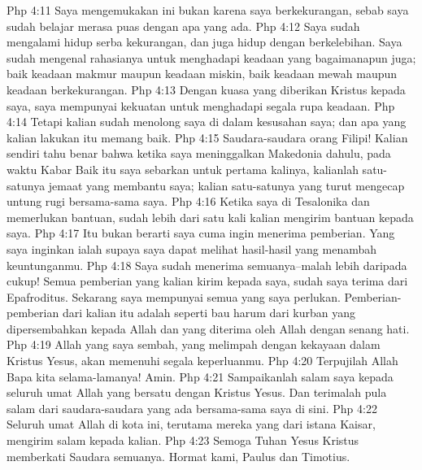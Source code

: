 Php 4:11  Saya mengemukakan ini bukan karena saya berkekurangan, sebab saya sudah belajar merasa puas dengan apa yang ada.
Php 4:12  Saya sudah mengalami hidup serba kekurangan, dan juga hidup dengan berkelebihan. Saya sudah mengenal rahasianya untuk menghadapi keadaan yang bagaimanapun juga; baik keadaan makmur maupun keadaan miskin, baik keadaan mewah maupun keadaan berkekurangan.
Php 4:13  Dengan kuasa yang diberikan Kristus kepada saya, saya mempunyai kekuatan untuk menghadapi segala rupa keadaan.
Php 4:14  Tetapi kalian sudah menolong saya di dalam kesusahan saya; dan apa yang kalian lakukan itu memang baik.
Php 4:15  Saudara-saudara orang Filipi! Kalian sendiri tahu benar bahwa ketika saya meninggalkan Makedonia dahulu, pada waktu Kabar Baik itu saya sebarkan untuk pertama kalinya, kalianlah satu-satunya jemaat yang membantu saya; kalian satu-satunya yang turut mengecap untung rugi bersama-sama saya.
Php 4:16  Ketika saya di Tesalonika dan memerlukan bantuan, sudah lebih dari satu kali kalian mengirim bantuan kepada saya.
Php 4:17  Itu bukan berarti saya cuma ingin menerima pemberian. Yang saya inginkan ialah supaya saya dapat melihat hasil-hasil yang menambah keuntunganmu.
Php 4:18  Saya sudah menerima semuanya--malah lebih daripada cukup! Semua pemberian yang kalian kirim kepada saya, sudah saya terima dari Epafroditus. Sekarang saya mempunyai semua yang saya perlukan. Pemberian-pemberian dari kalian itu adalah seperti bau harum dari kurban yang dipersembahkan kepada Allah dan yang diterima oleh Allah dengan senang hati.
Php 4:19  Allah yang saya sembah, yang melimpah dengan kekayaan dalam Kristus Yesus, akan memenuhi segala keperluanmu.
Php 4:20  Terpujilah Allah Bapa kita selama-lamanya! Amin.
Php 4:21  Sampaikanlah salam saya kepada seluruh umat Allah yang bersatu dengan Kristus Yesus. Dan terimalah pula salam dari saudara-saudara yang ada bersama-sama saya di sini.
Php 4:22  Seluruh umat Allah di kota ini, terutama mereka yang dari istana Kaisar, mengirim salam kepada kalian.
Php 4:23  Semoga Tuhan Yesus Kristus memberkati Saudara semuanya. Hormat kami, Paulus dan Timotius.


